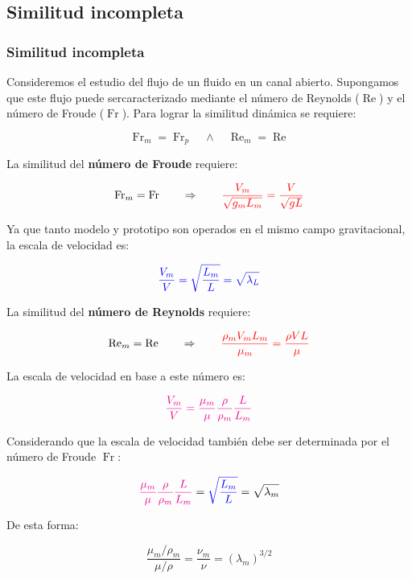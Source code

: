 \documentclass[t]{beamer}
\begin{document}
\subsection{Similitud incompleta}
\begin{frame}
\frametitle{Similitud incompleta}
 Consideremos el estudio del flujo de un fluido en un canal abierto. Supongamos que  este flujo puede sercaracterizado mediante el número de Reynolds ($\operatorname{Re}$) y el número de Froude ($\operatorname{Fr}$). Para lograr la similitud din\'amica se requiere:

$$\operatorname{Fr}_m = \operatorname{Fr}_p \quad\land\quad \operatorname{Re}_m = \operatorname{Re}$$

 La similitud del \textbf{n\'umero de Froude} requiere:

$$\operatorname{Fr}_m = \operatorname{Fr} \qquad \Rightarrow \qquad {\color{red}{\frac{V_m}{\sqrt{g_m L_m}} = \frac{V}{\sqrt{gL}}}}$$

 Ya que tanto modelo y prototipo son operados en el mismo campo gravitacional, la escala de velocidad es:

$$\color{blue}{\frac{V_m}{V} = \sqrt{\frac{L_m}{L}}=\sqrt{\lambda_L}}$$

\end{frame}
\begin{frame}
La similitud del \textbf{n\'umero de Reynolds} requiere:

$$
\operatorname{Re}_m = \operatorname{Re} \qquad \Rightarrow 
\qquad {\color{red}{\frac{\rho_m V_m L_m}{\mu_m} = \frac{\rho V L}{\mu}}}$$

 La escala de velocidad en base a este n\'umero es:

$$\color{magenta}{\frac{V_m}{V} = \frac{\mu_m}{\mu} \frac{\rho}{\rho_m} \frac{L}{L_m}}$$

 Considerando que la escala de velocidad tambi\'en debe ser determinada por el número de Froude $\operatorname{Fr}$:

$${\color{magenta}{\frac{\mu_m}{\mu} \frac{\rho}{\rho_m} \frac{L}{L_m}}} = {\color{blue}{\sqrt{\frac{L_m}{L}}}} = \sqrt{\lambda_m}$$

 De esta forma:

$$\frac{\mu_m / \rho_m}{\mu/\rho} = \frac{\nu_m}{\nu} = \left( \lambda_m\right)^{3/2}$$

\end{frame}
\end{document}
